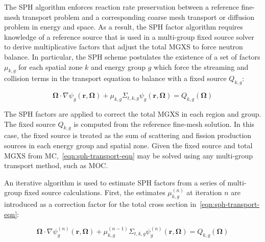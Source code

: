 The SPH algorithm enforces reaction rate preservation between a reference fine-mesh transport problem and a corresponding coarse mesh transport or diffusion problem in energy and space. As a result, the SPH factor algorithm requires knowledge of a reference source that is used in a multi-group fixed source solver to derive multiplicative factors that adjust the total MGXS to force neutron balance. In particular, the SPH scheme postulates the existence of a set of factors $\mu_{k,g}$ for each spatial zone $k$ and energy group $g$ which force the streaming and collision terms in the transport equation to balance with a fixed source $Q_{k,g}$:

\begin{dmath}
\label{eqn:sph-transport-eqn}
\mathbf{\Omega} \cdot \nabla \psi_{g}(\mathbf{r},\mathbf{\Omega}) + \mu_{k,g}\Sigma_{t,k,g}\psi_{g}(\mathbf{r},\mathbf{\Omega}) = Q_{k,g}(\mathbf{\Omega})
\end{dmath}

The SPH factors are applied to correct the total MGXS in each region and group. The fixed source $Q_{k,g}$ is computed from the reference fine-mesh solution. In this case, the fixed source is treated as the sum of scattering and fission production sources in each energy group and spatial zone. Given the fixed source and total MGXS from MC,~\autoref{eqn:sph-transport-eqn} may be solved using any multi-group transport method, such as MOC.




An iterative algorithm is used to estimate SPH factors from a series of multi-group fixed source calculations. First, the estimates $\mu_{k,g}^{(n)}$ at iteration $n$ are introduced as a correction factor for the total cross section in~\autoref{eqn:sph-transport-eqn}:

\begin{dmath}
\label{eqn:sph-transport-eqn-iterate}
\mathbf{\Omega} \cdot \nabla \psi_{g}^{(n)}(\mathbf{r},\mathbf{\Omega}) + \mu_{k,g}^{(n-1)}\Sigma_{t,k,g}\psi_{g}^{(n)}(\mathbf{r},\mathbf{\Omega}) = Q_{k,g}(\mathbf{\Omega})
\end{dmath}

